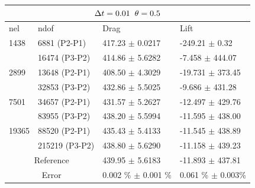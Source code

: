 \newpage
\begin{table}[h!]
\centering
\label{CFD-3 Results}
\begin{tabular}{ |p{1cm}||p{2.9cm}|p{3.3cm}|p{3.3cm}|}
 \hline
  \multicolumn{4}{|c|}{$\Delta t = 0.01 \hspace{2mm} \theta = 0.5$} \\
   \hline
nel & ndof & Drag  & Lift \\
\hline
 1438    & 6881  (P2-P1)   & 417.23       $\pm$   0.0217 & -249.21   $\pm$  0.32  \\
   & 16474 (P3-P2)   & 414.86      $\pm$  5.6282 & -7.458      $\pm$  444.07  \\
 \hline
 2899    & 13648  (P2-P1) & 408.50  $\pm$   4.3029 & -19.731  $\pm$   373.45 \\  
     &  32853 (P3-P2)  & 432.86      $\pm$  5.5025 & -9.686      $\pm$  431.28  \\
  \hline
  7501    & 34657 (P2-P1) & 431.57  $\pm$   5.2627 & -12.497  $\pm$   429.76 \\    
    &  83955 (P3-P2)  & 438.20      $\pm$  5.5994 & -11.595      $\pm$  438.00 \\
    \hline
    19365   & 88520 (P2-P1) & 435.43  $\pm$   5.4133 & -11.545  $\pm$   438.89 \\
   &   215219 (P3-P2) & 438.80      $\pm$  5.6290 & -11.158      $\pm$  439.23 \\
\hline
 \multicolumn{2}{|c|}{Reference}  & 439.95 $\pm$ 5.6183 & -11.893 $\pm$ 437.81\\
 \hline
  \multicolumn{2}{|c|}{Error}  & 0.002 \% $\pm$ 0.001 \% & 0.061 \% $\pm$ 0.003\% \\
  \hline
  \end{tabular}
\end{table}
